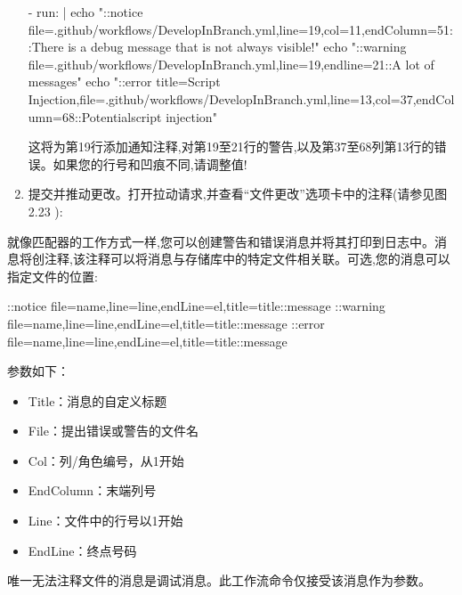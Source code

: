 \begin{enumerate}
\begin{shell}
- run: |
  echo "::notice file=.github/workflows/DevelopInBranch.yml,line=19,col=11,endColumn=51::There is a debug message that is not always visible!"
  echo "::warning file=.github/workflows/DevelopInBranch.yml,line=19,endline=21::A lot of messages"
  echo "::error title=Script Injection,file=.github/workflows/DevelopInBranch.yml,line=13,col=37,endColumn=68::Potentialscript injection"
\end{shell}

这将为第19行添加通知注释,对第19至21行的警告,以及第37至68列第13行的错误。如果您的行号和凹痕不同,请调整值!

\item 
提交并推动更改。打开拉动请求,并查看“文件更改”选项卡中的注释(请参见图2.23 ):

\end{enumerate}


就像匹配器的工作方式一样,您可以创建警告和错误消息并将其打印到日志中。消息将创注释,该注释可以将消息与存储库中的特定文件相关联。可选,您的消息可以指定文件的位置:

\begin{shell}
::notice file={name},line={line},endLine={el},title={title}::{message}
::warning
file={name},line={line},endLine={el},title={title}::{message}
::error file={name},line={line},endLine={el},title={title}::{message}
\end{shell}

参数如下：

\begin{itemize}
\item 
Title：消息的自定义标题

\item 
File：提出错误或警告的文件名

\item 
Col：列/角色编号，从1开始

\item 
EndColumn：末端列号

\item 
Line：文件中的行号以1开始

\item 
EndLine：终点号码
\end{itemize}

唯一无法注释文件的消息是调试消息。此工作流命令仅接受该消息作为参数。
